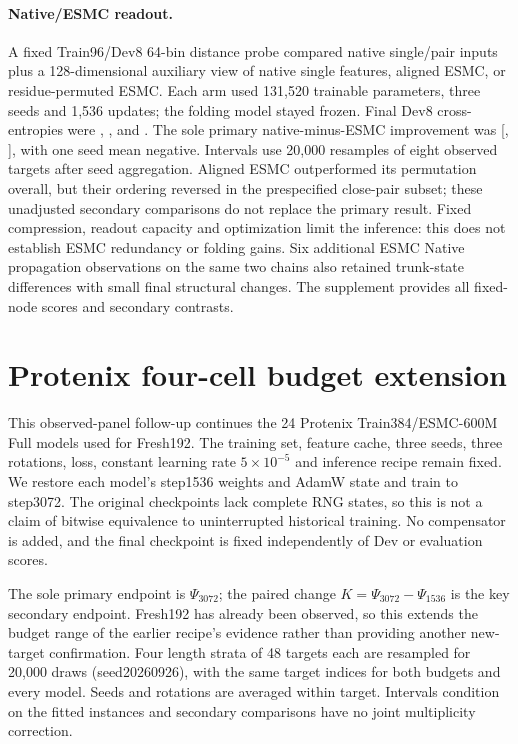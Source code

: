 \paragraph{Native/ESMC readout.}
A fixed Train96/Dev8 64-bin distance probe compared native single/pair inputs plus a
128-dimensional auxiliary view of native single features, aligned ESMC, or
residue-permuted ESMC. Each arm used 131,520 trainable parameters, three seeds
and 1,536 updates; the folding model stayed frozen. Final Dev8 cross-entropies
were , , and
. The sole primary native-minus-ESMC
improvement was 
[,
], with one seed mean negative.
Intervals use 20,000 resamples of eight observed targets after seed aggregation. Aligned ESMC
outperformed its permutation overall, but their ordering reversed in the
prespecified close-pair subset; these unadjusted secondary comparisons do not
replace the primary result. Fixed compression, readout capacity and optimization
limit the inference: this does not establish ESMC redundancy or folding gains.
Six additional ESMC Native propagation observations on the same two chains
also retained trunk-state differences with small final structural changes.
The supplement provides all fixed-node scores and secondary contrasts.

\section{Protenix four-cell budget extension}
\label{app:budget_extension}
This observed-panel follow-up continues the 24 Protenix Train384/ESMC-600M
Full models used for Fresh192. The training set, feature cache, three seeds,
three rotations, loss, constant learning rate $5\times10^{-5}$ and inference
recipe remain fixed. We restore each model's step1536 weights and AdamW state
and train to step3072. The original checkpoints lack complete RNG states, so
this is not a claim of bitwise equivalence to uninterrupted historical training.
No compensator is added, and the final checkpoint is fixed independently of
Dev or evaluation scores.

The sole primary endpoint is $\Psi_{3072}$; the paired change
$K=\Psi_{3072}-\Psi_{1536}$ is the key secondary endpoint. Fresh192 has already
been observed, so this extends the budget range of the earlier recipe's
evidence rather than providing another new-target confirmation. Four length
strata of 48 targets each are resampled for 20,000 draws (seed20260926), with
the same target indices for both budgets and every model. Seeds and rotations
are averaged within target. Intervals condition on the fitted instances and
secondary comparisons have no joint multiplicity correction.

